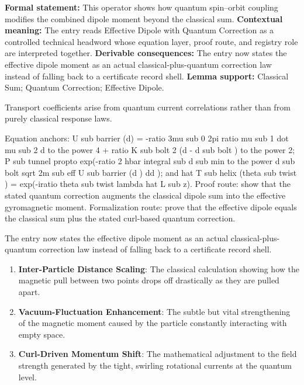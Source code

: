 \begingroup\footnotesize\setlength{\emergencystretch}{3em}\sloppy
\textbf{Formal statement:} This operator shows how quantum spin--orbit coupling modifies the combined dipole moment beyond the classical sum. \textbf{Contextual meaning:} The entry reads Effective Dipole with Quantum Correction as a controlled technical headword whose equation layer, proof route, and registry role are interpreted together. \textbf{Derivable consequences:} The entry now states the effective dipole moment as an actual classical-plus-quantum correction law instead of falling back to a certificate record shell. \textbf{Lemma support:} Classical Sum; Quantum Correction; Effective Dipole.\par
\endgroup

Transport coefficients arise from quantum current correlations rather than from purely classical response laws.

Equation anchors: U sub barrier (d) = -ratio 3mu sub 0 2pi ratio mu sub 1 dot mu sub 2 d to the power 4 + ratio K sub bolt 2 (d - d sub bolt ) to the power 2; P sub tunnel propto exp(-ratio 2 hbar integral sub d sub min to the power d sub bolt sqrt 2m sub eff U sub barrier (d ) dd ); and hat T sub helix (theta sub twist ) = exp(-iratio theta sub twist lambda hat L sub z). Proof route: show that the stated quantum correction augments the classical dipole sum into the effective gyromagnetic moment. Formalization route: prove that the effective dipole equals the classical sum plus the stated curl-based quantum correction.

The entry now states the effective dipole moment as an actual classical-plus-quantum correction law instead of falling back to a certificate record shell.
\endgroup

\begin{enumerate}[leftmargin=1.6em,itemsep=6pt,topsep=4pt]
\item \textbf{Inter-Particle Distance Scaling}: The classical calculation showing how the magnetic pull between two points drops off drastically as they are pulled apart.
\item \textbf{Vacuum-Fluctuation Enhancement}: The subtle but vital strengthening of the magnetic moment caused by the particle constantly interacting with empty space.
\item \textbf{Curl-Driven Momentum Shift}: The mathematical adjustment to the field strength generated by the tight, swirling rotational currents at the quantum level.
\end{enumerate}

